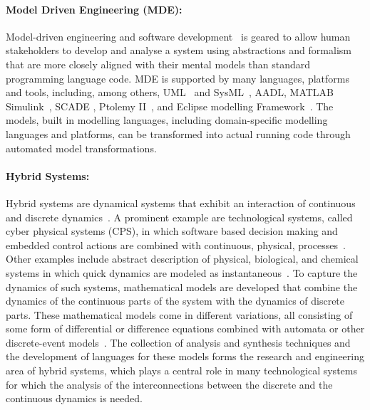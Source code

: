 \documentclass[11pt]{article}
\newcounter{example}
\begin{document}
\paragraph{Model Driven Engineering (MDE):} Model-driven engineering and software development~\cite{brambilla2017model,Shull2016} is geared to allow human stakeholders to develop and analyse a system using abstractions and formalism that are more closely aligned with their mental models than standard programming language code. MDE is supported by many languages, platforms and tools, including, among others, UML~\cite{UML2011} and SysML~\cite{OMGSysML2010}, AADL\cite{YANG2010}, MATLAB Simulink~\cite{Chaturvedi2017}, SCADE \cite{Sergent2012}, Ptolemy II~\cite{Hylands2003}, and Eclipse modelling Framework~\cite{BillMooreDavidDean2010}. The models, built in modelling languages, including domain-specific modelling languages and platforms, can be transformed into actual running code through automated model transformations. 

\paragraph{Hybrid Systems:}  Hybrid systems are dynamical systems that exhibit an interaction of continuous and discrete dynamics~\cite{Alur1995}. A prominent example are technological systems, called cyber physical systems (CPS), in which software based decision making and embedded control actions are combined with continuous, physical, processes~\cite{Lee2010}. Other examples include abstract description of physical, biological, and chemical systems in which quick dynamics are modeled as instantaneous~\cite{Lee2008}. To capture the dynamics of such systems, mathematical models are developed that combine the dynamics of the continuous parts of the system with the dynamics of discrete parts. These mathematical models come in different variations, all consisting of some form of differential or difference equations combined with automata or other discrete-event models~\cite{Lygeros2003}. The collection of analysis and synthesis techniques and the development of languages for these models forms the research and engineering area of hybrid systems, which plays a central role in many technological systems for which the analysis of the interconnections between the discrete and the continuous dynamics is needed.
\end{document}
